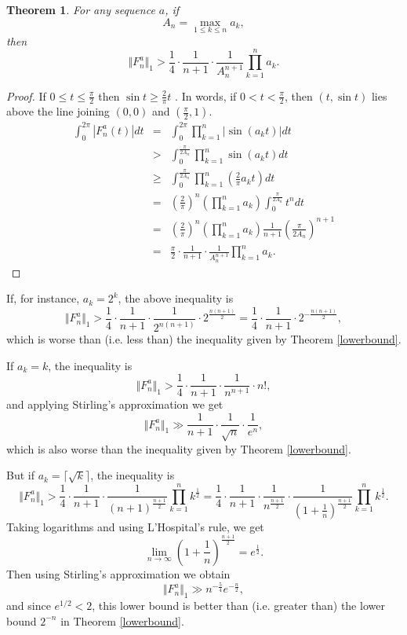 \documentclass{article}
\newcommand{\norm}[1]{\Vert #1 \Vert}
\newtheorem{theorem}{Theorem}
\begin{document}
\begin{theorem}
For any sequence $a$,
if
\[
A_n=\max_{1 \leq k \leq n} a_k,
\]
then
\[
\norm{F_n^a}_1 > \frac{1}{4} \cdot \frac{1}{n+1} \cdot \frac{1}{A_n^{n+1}} \prod_{k=1}^n a_k.
\]
\label{triangle}
\end{theorem}
\begin{proof}
If $0 \leq t \leq \frac{\pi}{2}$ then $\sin t \geq \frac{2}{\pi}t$ \cite{yuefeng}. In words, if $0 < t < \frac{\pi}{2}$, then $(t,\sin t)$ lies above
the line joining $(0,0)$ and $(\frac{\pi}{2},1)$. 
\begin{eqnarray*}
\int_0^{2\pi} |F_n^a(t)| dt&=&\int_0^{2\pi} \prod_{k=1}^n |\sin(a_k t)| dt\\
&>&\int_0^{\frac{\pi}{2A_n}} \prod_{k=1}^n \sin(a_k t) dt\\
&\geq&\int_0^{\frac{\pi}{2A_n}} \prod_{k=1}^n\left( \frac{2}{\pi} a_k t \right) dt\\
&=&\left( \frac{2}{\pi} \right)^n \left( \prod_{k=1}^n a_k \right)\int_0^{\frac{\pi}{2A_n}} t^n dt\\
&=&\left( \frac{2}{\pi} \right)^n \left( \prod_{k=1}^n a_k \right) \frac{1}{n+1} \left( \frac{\pi}{2A_n} \right)^{n+1}\\
&=&\frac{\pi}{2} \cdot \frac{1}{n+1} \cdot \frac{1}{A_n^{n+1}} \prod_{k=1}^n a_k.
\end{eqnarray*}
\end{proof}

If, for instance, $a_k=2^k$, the above inequality is
\[
\norm{F_n^a}_1 > \frac{1}{4} \cdot \frac{1}{n+1} \cdot \frac{1}{2^{n(n+1)}} \cdot 2^{\frac{n(n+1)}{2}} =
\frac{1}{4} \cdot \frac{1}{n+1} \cdot 2^{-\frac{n(n+1)}{2}},
\]
which is worse than (i.e. less than) the inequality given by Theorem \ref{lowerbound}. 

If $a_k=k$, the inequality is
\[
\norm{F_n^a}_1> \frac{1}{4} \cdot \frac{1}{n+1} \cdot \frac{1}{n^{n+1}} \cdot n!,
\]
and applying Stirling's approximation we get
\[
\norm{F_n^a}_1 \gg \frac{1}{n+1} \cdot \frac{1}{\sqrt{n}} \cdot \frac{1}{e^n},
\]
which is also worse than the inequality given by Theorem \ref{lowerbound}. 

But if $a_k=\lceil \sqrt{k} \rceil$, the inequality is
\[
\norm{F_n^a}_1 >  \frac{1}{4} \cdot \frac{1}{n+1} \cdot \frac{1}{(n+1)^{\frac{n+1}{2}}} \prod_{k=1}^n k^{\frac{1}{2}}=
 \frac{1}{4} \cdot \frac{1}{n+1} \cdot \frac{1}{n^{\frac{n+1}{2}}} \cdot \frac{1}{\left(1+\frac{1}{n} \right)^{\frac{n+1}{2}}} \prod_{k=1}^n k^{\frac{1}{2}}.
\]
Taking logarithms and using L'Hospital's rule, we get
\[
\lim_{n \to \infty} \left(1+\frac{1}{n} \right)^{\frac{n+1}{2}}=e^{\frac{1}{2}}.
\]
Then using Stirling's approximation we obtain
\[
\norm{F_n^a}_1 \gg n^{-\frac{5}{4}} e^{-\frac{n}{2}},
\]
and since $e^{1/2}<2$, this lower bound is better than (i.e. greater than) the lower bound $2^{-n}$ in Theorem \ref{lowerbound}. 
\end{document}
